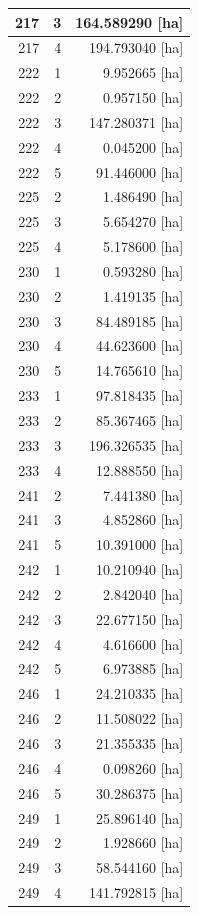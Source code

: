 \documentclass[11pt,]{book}
\begin{document}
\begin{table}
\begin{tabular}[t]{r|r|r}
\hline
217 & 3 & 164.589290 [ha]\\
\hline
217 & 4 & 194.793040 [ha]\\
\hline
222 & 1 & 9.952665 [ha]\\
\hline
222 & 2 & 0.957150 [ha]\\
\hline
222 & 3 & 147.280371 [ha]\\
\hline
222 & 4 & 0.045200 [ha]\\
\hline
222 & 5 & 91.446000 [ha]\\
\hline
225 & 2 & 1.486490 [ha]\\
\hline
225 & 3 & 5.654270 [ha]\\
\hline
225 & 4 & 5.178600 [ha]\\
\hline
230 & 1 & 0.593280 [ha]\\
\hline
230 & 2 & 1.419135 [ha]\\
\hline
230 & 3 & 84.489185 [ha]\\
\hline
230 & 4 & 44.623600 [ha]\\
\hline
230 & 5 & 14.765610 [ha]\\
\hline
233 & 1 & 97.818435 [ha]\\
\hline
233 & 2 & 85.367465 [ha]\\
\hline
233 & 3 & 196.326535 [ha]\\
\hline
233 & 4 & 12.888550 [ha]\\
\hline
241 & 2 & 7.441380 [ha]\\
\hline
241 & 3 & 4.852860 [ha]\\
\hline
241 & 5 & 10.391000 [ha]\\
\hline
242 & 1 & 10.210940 [ha]\\
\hline
242 & 2 & 2.842040 [ha]\\
\hline
242 & 3 & 22.677150 [ha]\\
\hline
242 & 4 & 4.616600 [ha]\\
\hline
242 & 5 & 6.973885 [ha]\\
\hline
246 & 1 & 24.210335 [ha]\\
\hline
246 & 2 & 11.508022 [ha]\\
\hline
246 & 3 & 21.355335 [ha]\\
\hline
246 & 4 & 0.098260 [ha]\\
\hline
246 & 5 & 30.286375 [ha]\\
\hline
249 & 1 & 25.896140 [ha]\\
\hline
249 & 2 & 1.928660 [ha]\\
\hline
249 & 3 & 58.544160 [ha]\\
\hline
249 & 4 & 141.792815 [ha]\\

\end{tabular}
\end{table}
\end{document}
